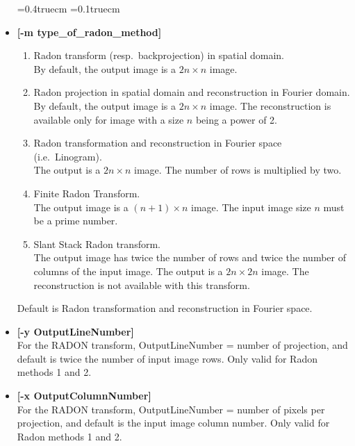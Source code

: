 \begin{itemize}
\baselineskip=0.4truecm
\itemsep=0.1truecm
\item {\bf [-m type\_of\_radon\_method]}  
{\small 
\begin{enumerate}
\baselineskip=0.4truecm
\itemsep=0.1truecm
\item  Radon transform (resp.\ backprojection) in spatial domain. \\
       By default, the output image is a $2n \times n$ image.
\item  Radon projection in spatial domain and reconstruction in Fourier domain.
       By default, the output image is a $2n \times n$ image.
       The reconstruction is available only for image with
       a size $n$ being a power of 2.
\item  Radon transformation and reconstruction in Fourier space 
       (i.e.\ Linogram). \\
       The output is a 
       $2n \times n$ image. The number of rows is multiplied by two.
\item  Finite Radon Transform. \\
       The output image is a $(n+1) \times n$ image. The input image size $n$
       must be a prime number.
\item  Slant Stack Radon transform. \\
       The output image has twice the number of rows and twice the number
       of columns of the input image.
       The output is a $2n \times 2n$ image.
       The reconstruction is not available with this transform.
\end{enumerate}}
Default is Radon transformation and reconstruction in Fourier space.

\item {\bf [-y OutputLineNumber]} \\
For the RADON transform, OutputLineNumber = number of projection,
 and default is twice the number of input image rows. Only valid for Radon
methods 1 and 2.\\

\item {\bf [-x OutputColumnNumber]} \\
For the RADON transform, OutputLineNumber = number of pixels per projection,
and default is the input image column number. Only valid for Radon
methods 1 and 2.\\


\end{itemize}
